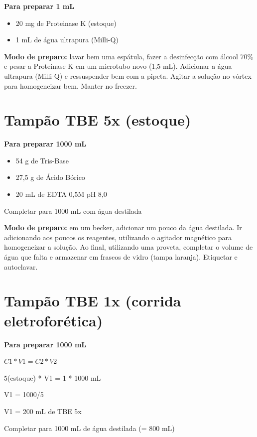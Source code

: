 \documentclass[
  letterpaper,
  DIV=11,
  numbers=noendperiod]{scrreprt}
\begin{document}
\textbf{Para preparar 1 mL}

\begin{itemize}
\item
  20 mg de Proteinase K (estoque)
\item
  1 mL de água ultrapura (Milli-Q)
\end{itemize}

\textbf{Modo de preparo:} lavar bem uma espátula, fazer a desinfecção
com álcool 70\% e pesar a Proteinase K em um microtubo novo (1,5 mL).
Adicionar a água ultrapura (Milli-Q) e ressuspender bem com a pipeta.
Agitar a solução no vórtex para homogeneizar bem. Manter no freezer.

\hypertarget{tampuxe3o-tbe-5x-estoque}{%
\section{Tampão TBE 5x (estoque)}\label{tampuxe3o-tbe-5x-estoque}}

\textbf{Para preparar 1000 mL}

\begin{itemize}
\item
  54 g de Tris-Base
\item
  27,5 g de Ácido Bórico
\item
  20 mL de EDTA 0,5M pH 8,0
\end{itemize}

Completar para 1000 mL com água destilada

\textbf{Modo de preparo:} em um becker, adicionar um pouco da água
destilada. Ir adicionando aos poucos os reagentes, utilizando o agitador
magnético para homogeneizar a solução. Ao final, utilizando uma proveta,
completar o volume de água que falta e armazenar em frascos de vidro
(tampa laranja). Etiquetar e autoclavar.

\hypertarget{tampuxe3o-tbe-1x-corrida-eletroforuxe9tica}{%
\section{Tampão TBE 1x (corrida
eletroforética)}\label{tampuxe3o-tbe-1x-corrida-eletroforuxe9tica}}

\textbf{Para preparar 1000 mL}

\(C1 * V1 = C2 * V2\)

5(estoque) * V1 = 1 * 1000 mL

V1 = 1000/5

V1 = 200 mL de TBE 5x

Completar para 1000 mL de água destilada (= 800 mL)
\end{document}
